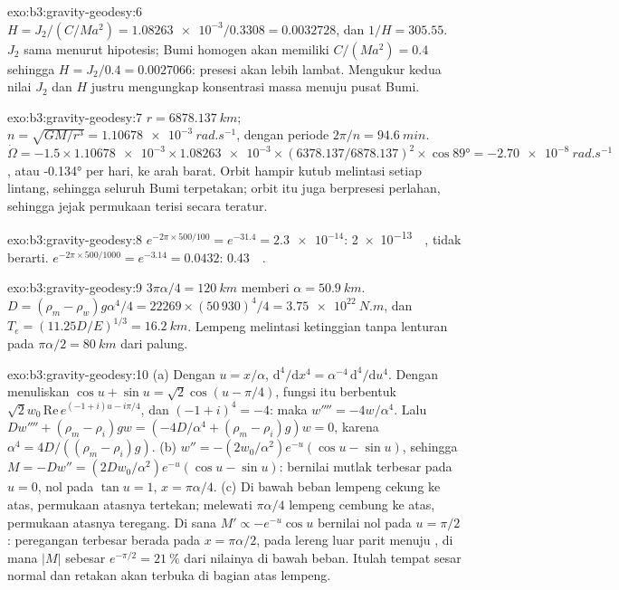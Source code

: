 \begin{solution}{exo:b3:gravity-geodesy:6}
$H = J_2/(C/Ma^2) = \num{1.08263e-3}/0.3308 = \num{0.0032728}$, dan
$1/H = 305.55$. $J_2$ sama menurut hipotesis; Bumi homogen akan memiliki
$C/(Ma^2) = 0.4$ sehingga $H = J_2/0.4 = \num{0.0027066}$: presesi akan
lebih lambat. Mengukur kedua nilai $J_2$ dan $H$ justru mengungkap konsentrasi massa
menuju pusat Bumi.
\end{solution}

\begin{solution}{exo:b3:gravity-geodesy:7}
$r = \qty{6878.137}{km}$; $n = \sqrt{GM/r^3} = \qty{1.10678e-3}{rad.s^{-1}}$, dengan
periode $2\pi/n = \qty{94.6}{min}$. $\dot\Omega = -1.5\times\num{1.10678e-3}
\times\num{1.08263e-3}\times(6378.137/6878.137)^2\times\cos\ang{89} =
\qty{-2.70e-8}{rad.s^{-1}}$, atau \ang{-0.134} per hari, ke arah barat. Orbit hampir kutub
melintasi setiap lintang, sehingga seluruh Bumi terpetakan; orbit itu juga berpresesi
perlahan, sehingga jejak permukaan terisi secara teratur.
\end{solution}

\begin{solution}{exo:b3:gravity-geodesy:8}
$e^{-2\pi\times500/100} = e^{-31.4} = \num{2.3e-14}$: \qty{2e-13}{\milli\gal},
tidak berarti. $e^{-2\pi\times500/1000} = e^{-3.14} = 0.0432$:
\qty{0.43}{\milli\gal}.
\end{solution}

\begin{solution}{exo:b3:gravity-geodesy:9}
$3\pi\alpha/4 = \qty{120}{km}$ memberi $\alpha = \qty{50.9}{km}$.
$D = (\rho_m - \rho_w)g\alpha^4/4 = 22269\times(50\,930)^4/4 =
\qty{3.75e22}{N.m}$, dan $T_e = (11.25D/E)^{1/3} = \qty{16.2}{km}$. Lempeng
melintasi ketinggian tanpa lenturan pada $\pi\alpha/2 = \qty{80}{km}$ dari palung.
\end{solution}

\begin{solution}{exo:b3:gravity-geodesy:10}
(a) Dengan $u = x/\alpha$, $\mathrm d^4/\mathrm dx^4 = \alpha^{-4}\,\mathrm
d^4/\mathrm du^4$. Dengan menuliskan $\cos u + \sin u = \sqrt2\cos(u - \pi/4)$, fungsi
itu berbentuk $\sqrt2w_0\,\mathrm{Re}\,e^{(-1 + i)u - i\pi/4}$, dan
$(-1 + i)^4 = -4$: maka $w'''' = -4w/\alpha^4$. Lalu $Dw'''' + (\rho_m -
\rho_i)gw = (-4D/\alpha^4 + (\rho_m - \rho_i)g)w = 0$, karena $\alpha^4 =
4D/((\rho_m - \rho_i)g)$. (b) $w'' = -(2w_0/\alpha^2)e^{-u}(\cos u - \sin u)$, sehingga
$M = -Dw'' = (2Dw_0/\alpha^2)e^{-u}(\cos u - \sin u)$: bernilai mutlak terbesar pada
$u = 0$, nol pada $\tan u = 1$, $x = \pi\alpha/4$. (c) Di bawah beban
lempeng cekung ke atas, permukaan atasnya tertekan; melewati $\pi\alpha/4$
lempeng cembung ke atas, permukaan atasnya teregang. Di sana $M' \propto
-e^{-u}\cos u$ bernilai nol pada $u = \pi/2$: peregangan terbesar berada pada
$x = \pi\alpha/2$, pada lereng luar parit menuju , di mana
$|M|$ sebesar $e^{-\pi/2} = \qty{21}{\percent}$ dari nilainya di bawah beban. Itulah
tempat sesar normal dan retakan akan terbuka di bagian atas lempeng.
\end{solution}

